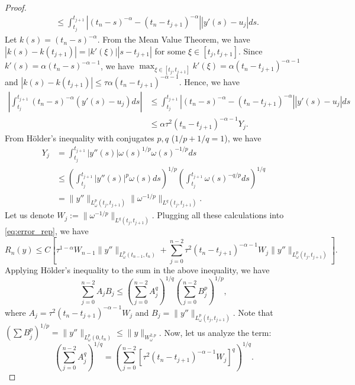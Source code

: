 \documentclass[10pt,a4paper]{amsart}
\begin{document}
\begin{proof}
\begin{align}
    &\le \int_{t_j}^{t_{j+1}} |(t_n - s)^{-\alpha} - (t_n - t_{j+1})^{-\alpha}| |y'(s) - u_j| ds.
\end{align}
Let $k(s) = (t_n-s)^{-\alpha}$. From the Mean Value Theorem, we have $|k(s) - k(t_{j+1})| = |k'(\xi)||s-t_{j+1}|$ for some $\xi\in[t_j, t_{j+1}]$. Since $k'(s) = \alpha(t_n-s)^{-\alpha-1}$, we have $\max_{\xi\in[t_j, t_{j+1}]}k'(\xi) = \alpha(t_n-t_{j+1})^{-\alpha-1}$ and $|k(s) - k(t_{j+1})| \leq\tau\alpha(t_n-t_{j+1})^{-\alpha-1}$. Hence, we have
\begin{align}
    \left|\int_{t_j}^{t_{j+1}} (t_n - s)^{-\alpha} (y'(s) - u_j) ds \right| &\le \int_{t_j}^{t_{j+1}} |(t_n - s)^{-\alpha} - (t_n - t_{j+1})^{-\alpha}| |y'(s) - u_j| ds \nonumber \\
    &\le \alpha \tau^2 (t_n - t_{j+1})^{-\alpha-1} Y_j.
\end{align}
From H\"older's inequality with conjugates $p, q$ ($1/p + 1/q = 1$), we have
\begin{align}
    Y_j &= \int_{t_j}^{t_{j+1}} |y''(s)| \omega(s)^{1/p} \omega(s)^{-1/p} ds \nonumber \\
    &\le \left( \int_{t_j}^{t_{j+1}} |y''(s)|^p \omega(s) ds \right)^{1/p} \left( \int_{t_j}^{t_{j+1}} \omega(s)^{-q/p} ds \right)^{1/q} \nonumber \\
    &= \|y''\|_{L^p_\omega(t_j, t_{j+1})} \|\omega^{-1/p}\|_{L^q(t_j, t_{j+1})}.
\end{align}
Let us denote $W_j := \|\omega^{-1/p}\|_{L^q(t_j, t_{j+1})}$. Plugging all these calculations into \eqref{eq:error_rep}, we have
\begin{equation}
    R_n(y) \le C \left[ \tau^{1-\alpha} W_{n-1} \|y''\|_{L^p_\omega(t_{n-1}, t_{n})} + \sum_{j=0}^{n-2} \tau^2 (t_n - t_{j+1})^{-\alpha-1} W_j \|y''\|_{L^p_\omega(t_j, t_{j+1})} \right].
\end{equation}
Applying H\"older's inequality to the sum in the above inequality, we have
\begin{equation}
    \sum_{j=0}^{n-2} A_j B_j \le \left( \sum_{j=0}^{n-2} A_j^q \right)^{1/q} \left( \sum_{j=0}^{n-2} B_j^p \right)^{1/p},
\end{equation}
where $A_j =\tau^2 (t_n - t_{j+1})^{-\alpha-1} W_j$ and $B_j = \|y''\|_{L^p_\omega(t_j, t_{j+1})}$. Note that $(\sum B_j^p)^{1/p} = \|y''\|_{L^p_\omega(0,t_n)} \le \|y\|_{W^{2,p}_\omega}$. Now, let us analyze the term:
\begin{equation}
    \left( \sum_{j=0}^{n-2} A_j^q \right)^{1/q} = \left( \sum_{j=0}^{n-2} \left[ \tau^2 (t_n - t_{j+1})^{-\alpha-1} W_j \right]^q \right)^{1/q}.

\end{equation}
\end{proof}
\end{document}

